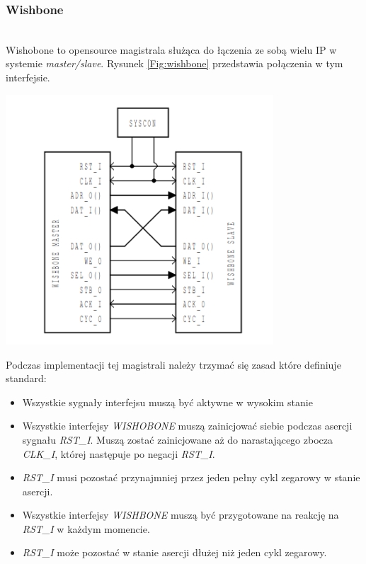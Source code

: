 \documentclass[11pt,a4paper]{article}
\begin{document}
		\subsubsection{Wishbone}
		\hspace{5mm}
			\\Wishobone to opensource magistrala służąca do łączenia ze sobą wielu IP w systemie \textit{master/slave}. Rysunek \ref{Fig:wishbone} przedstawia połączenia w tym interfejsie.
			\begin{samepage}
				\nopagebreak
				\begin{center}
					\includegraphics[width=10cm]{./rysunki/wishbone.png}
				\end{center}
			\end{samepage}
			Podczas implementacji tej magistrali należy trzymać się zasad które definiuje standard:
			\begin{itemize}
				\item Wszystkie sygnały interfejsu muszą być aktywne w wysokim stanie
				\item Wszystkie interfejsy \textit{WISHOBONE} muszą zainicjować siebie podczas asercji sygnału \textit{RST\_I}. Muszą zostać zainicjowane aż do narastającego zbocza \textit{CLK\_I}, której następuje po negacji \textit{RST\_I}.
				\item \textit{RST\_I} musi pozostać przynajmniej przez jeden pełny cykl zegarowy w stanie asercji.
				\item Wszystkie interfejsy \textit{WISHBONE} muszą być przygotowane na reakcję na \textit{RST\_I} w każdym momencie.
				\item \textit{RST\_I} może pozostać w stanie asercji dłużej niż jeden cykl zegarowy.
			\end{itemize}
\end{document}
